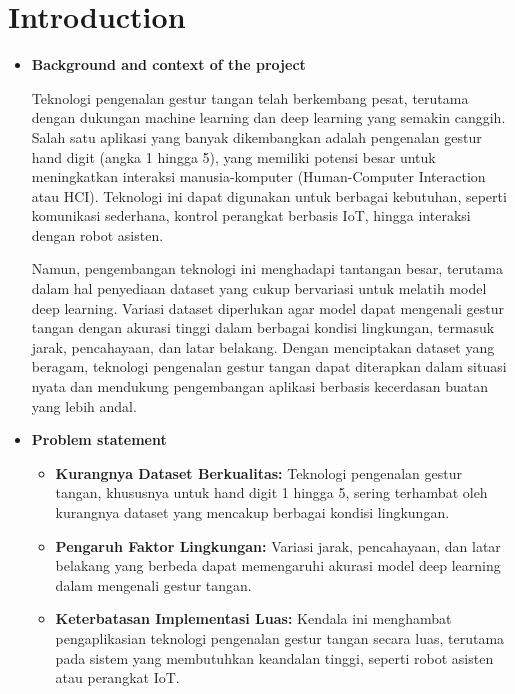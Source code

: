 \documentclass[12pt,a4paper]{article}
\begin{document}
\tableofcontents
\newpage

\section{\uppercase Introduction}
\begin{itemize}
    \item \textbf {Background and context of the project}

   \hspace{0.5cm} Teknologi pengenalan gestur tangan telah berkembang pesat, terutama dengan dukungan machine learning dan deep learning yang semakin canggih. Salah satu aplikasi yang banyak dikembangkan adalah pengenalan gestur hand digit (angka 1 hingga 5), yang memiliki potensi besar untuk meningkatkan interaksi manusia-komputer (Human-Computer Interaction atau HCI). Teknologi ini dapat digunakan untuk berbagai kebutuhan, seperti komunikasi sederhana, kontrol perangkat berbasis IoT, hingga interaksi dengan robot asisten.
   
   \hspace{0.5cm} Namun, pengembangan teknologi ini menghadapi tantangan besar, terutama dalam hal penyediaan dataset yang cukup bervariasi untuk melatih model deep learning. Variasi dataset diperlukan agar model dapat mengenali gestur tangan dengan akurasi tinggi dalam berbagai kondisi lingkungan, termasuk jarak, pencahayaan, dan latar belakang. Dengan menciptakan dataset yang beragam, teknologi pengenalan gestur tangan dapat diterapkan dalam situasi nyata dan mendukung pengembangan aplikasi berbasis kecerdasan buatan yang lebih andal.

    \item \textbf {Problem statement}
    
    \begin{itemize}
        \item \textbf{Kurangnya Dataset Berkualitas:} Teknologi pengenalan gestur tangan, khususnya untuk hand digit 1 hingga 5, sering terhambat oleh kurangnya dataset yang mencakup berbagai kondisi lingkungan.

        \item \textbf{Pengaruh Faktor Lingkungan:} Variasi jarak, pencahayaan, dan latar belakang yang berbeda dapat memengaruhi akurasi model deep learning dalam mengenali gestur tangan.

        \item \textbf{Keterbatasan Implementasi Luas:} Kendala ini menghambat pengaplikasian teknologi pengenalan gestur tangan secara luas, terutama pada sistem yang membutuhkan keandalan tinggi, seperti robot asisten atau perangkat IoT.
        

\end{itemize}
\end{itemize}
\end{document}
